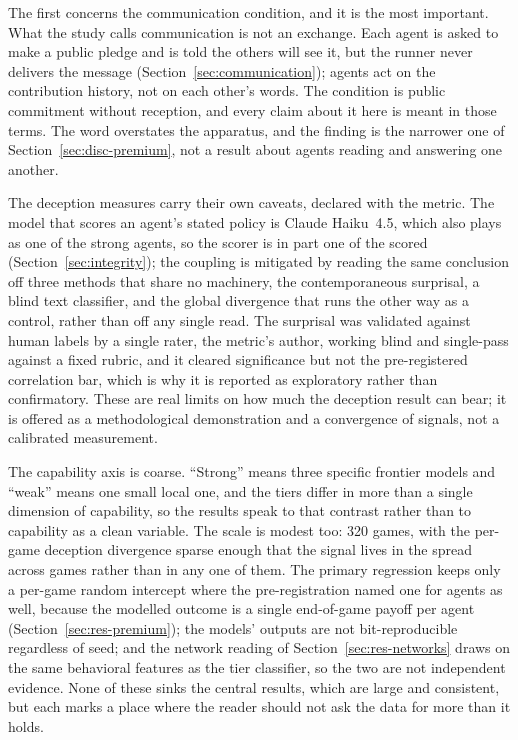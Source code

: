 The first concerns the communication condition, and it is the most important. What the study
calls communication is not an exchange. Each agent is asked to make a public pledge and is told
the others will see it, but the runner never delivers the message
(Section~\ref{sec:communication}); agents act on the contribution history, not on each other's
words. The condition is public commitment without reception, and every claim about it here is
meant in those terms. The word overstates the apparatus, and the finding is the narrower one of
Section~\ref{sec:disc-premium}, not a result about agents reading and answering one another.

The deception measures carry their own caveats, declared with the metric. The model that scores
an agent's stated policy is Claude Haiku~4.5, which also plays as one of the strong agents, so
the scorer is in part one of the scored (Section~\ref{sec:integrity}); the coupling is mitigated
by reading the same conclusion off three methods that share no machinery, the contemporaneous
surprisal, a blind text classifier, and the global divergence that runs the other way as a
control, rather than off any single read. The surprisal was validated against human labels by a
single rater, the metric's author, working blind and single-pass against a fixed rubric, and it
cleared significance but not the pre-registered correlation bar, which is why it is reported as
exploratory rather than confirmatory. These are real limits on how much the deception result can
bear; it is offered as a methodological demonstration and a convergence of signals, not a
calibrated measurement.

The capability axis is coarse. ``Strong'' means three specific frontier models and ``weak'' means
one small local one, and the tiers differ in more than a single dimension of capability, so the
results speak to that contrast rather than to capability as a clean variable. The scale is modest
too: 320 games, with the per-game deception divergence sparse enough that the signal lives in the
spread across games rather than in any one of them. The primary regression keeps only a per-game
random intercept where the pre-registration named one for agents as well, because the modelled
outcome is a single end-of-game payoff per agent (Section~\ref{sec:res-premium}); the models'
outputs are not bit-reproducible regardless of seed; and the network reading of
Section~\ref{sec:res-networks} draws on the same behavioral features as the tier classifier, so
the two are not independent evidence. None of these sinks the central results, which are large
and consistent, but each marks a place where the reader should not ask the data for more than it
holds.

